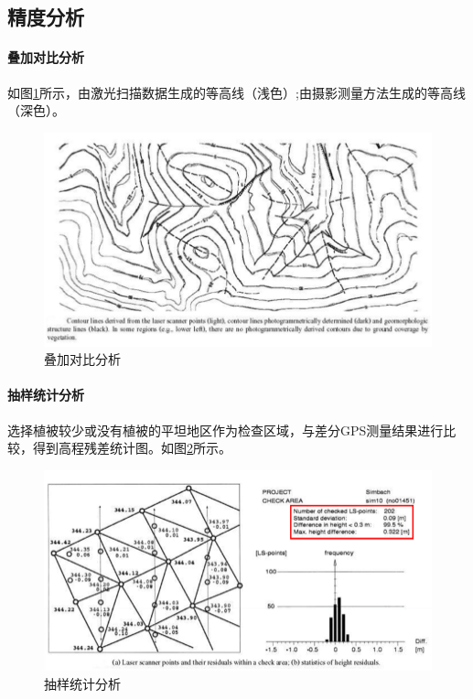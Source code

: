 \subsection{精度分析}

\paragraph{叠加对比分析}如图\ref{fig:叠加对比分析}所示，由激光扫描数据生成的等高线（浅色）;由摄影测量方法生成的等高线（深色）。
\begin{figure}[htbp]
	\centering
	\includegraphics[width=0.8\linewidth]{figure/Chapter6/叠加对比分析}
	\caption{叠加对比分析}
	\label{fig:叠加对比分析}
\end{figure}

\paragraph{抽样统计分析}选择植被较少或没有植被的平坦地区作为检查区域，与差分GPS测量结果进行比较，得到高程残差统计图。如图\ref{fig:抽样统计分析}所示。
\begin{figure}[htbp]
	\centering
	\includegraphics[width=0.8\linewidth]{figure/Chapter6/抽样统计分析}
	\caption{抽样统计分析}
	\label{fig:抽样统计分析}
\end{figure}

